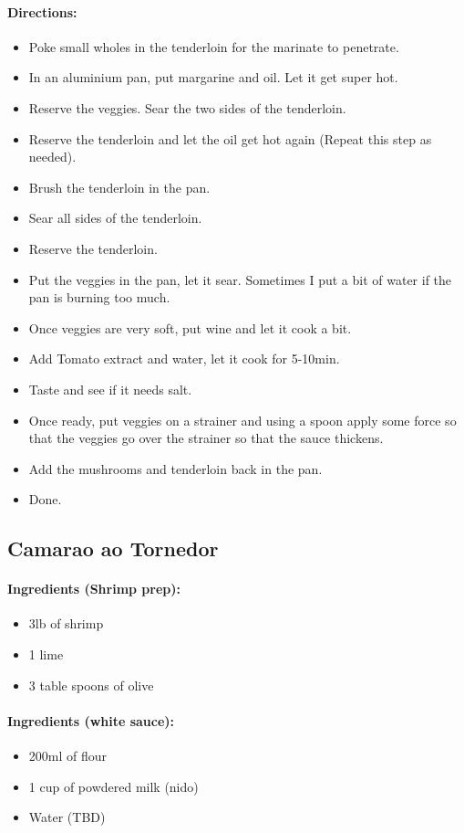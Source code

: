\documentclass{article}
\begin{document}
\paragraph{Directions:}
\begin{itemize}
	\item Poke small wholes in the tenderloin for the marinate to penetrate.
	\item In an aluminium pan, put margarine and oil. Let it get super hot.
	\item Reserve the veggies. Sear the two sides of the tenderloin.
	\item Reserve the tenderloin and let the oil get hot again (Repeat this step as needed).
	\item Brush the tenderloin in the pan.
	\item Sear all sides of the tenderloin.
	\item Reserve the tenderloin.
	\item Put the veggies in the pan, let it sear. Sometimes I put a bit of water if the pan is burning too much.
	\item Once veggies are very soft, put wine and let it cook a bit.
	\item Add Tomato extract and water, let it cook for 5-10min.
	\item Taste and see if it needs salt.
	\item Once ready, put veggies on a strainer and using a spoon apply some force so that the veggies go over the strainer so that the sauce thickens.
	\item Add the mushrooms and tenderloin back in the pan.
	\item Done.
\end{itemize}

\subsection{Camarao ao Tornedor}

\paragraph{Ingredients (Shrimp prep):}
\begin{itemize}
	\item 3lb of shrimp
	\item 1 lime
	\item 3 table spoons of olive
\end{itemize}

\paragraph{Ingredients (white sauce):}
\begin{itemize}
	\item 200ml of flour
	\item 1 cup of powdered milk (nido)
	\item Water (TBD)
\end{itemize}
\end{document}
